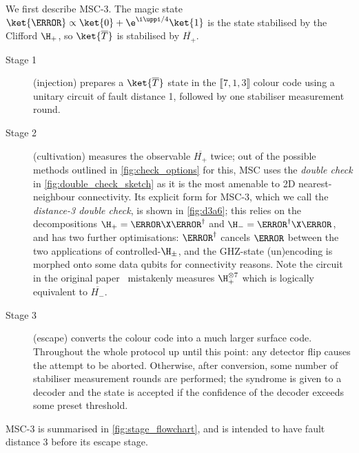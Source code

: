 We first describe MSC-3.
The magic state $\ket{\T} \propto \ket{0} +\e^{\i \uppi/4} \ket{1}$
is the state stabilised by the Clifford $\H_+$,
so $\ket{\overline{T}}$ is stabilised by $\overline{H_+}$.
\begin{description}
	\item[Stage 1] (injection) prepares a $\ket{\overline{T}}$ state
	in the $\llbracket 7, 1, 3 \rrbracket$ colour code
	using a unitary circuit of fault distance 1,
	followed by one stabiliser measurement round.
	\item[Stage 2] (cultivation) measures the observable $\overline{H_+}$ twice;
	out of the possible methods outlined in \cref{fig:check_options} for this,
	MSC uses the \emph{double check} in \cref{fig:double_check_sketch}
	as it is the most amenable to 2D nearest-neighbour connectivity.
	Its explicit form for MSC-3,
	which we call the \emph{distance-3 double check},
	is shown in \cref{fig:d3a6};
	this relies on the decompositions
	$\H_+ =\T\X\T^\dag$ and
	$\H_- =\T^\dag \X\T$,
	and has two further optimisations:
	$\T^\dag$ cancels $\T$ between the two applications of controlled-$\H_\pm$,
	and the GHZ-state (un)encoding is morphed onto some data qubits
	for connectivity reasons.
	Note the circuit in the original paper~\cite[Figure~7]{Gidney2024} mistakenly
	measures $\H_+^{\otimes 7}$ which is logically equivalent to $\overline{H_-}$.
	\item[Stage 3] (escape) converts the colour code into a much larger surface code.
	Throughout the whole protocol up until this point:
	any detector flip causes the attempt to be aborted.
	Otherwise, after conversion,
	some number of stabiliser measurement rounds are performed;
	the syndrome is given to a decoder and the state is accepted
	if the confidence of the decoder exceeds some preset threshold.
\end{description}
MSC-3 is summarised in \cref{fig:stage_flowchart},
and is intended to have fault distance 3 before its escape stage.
